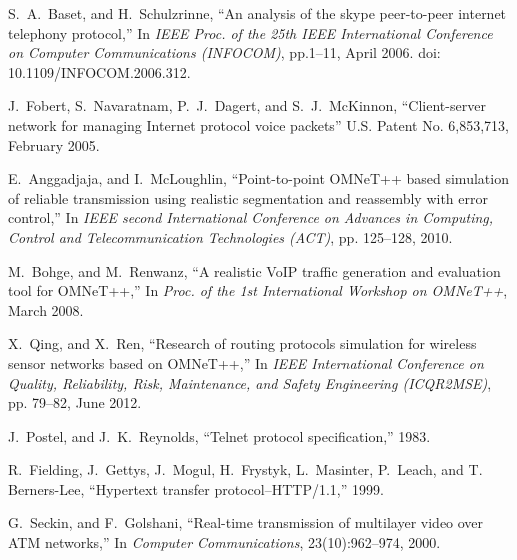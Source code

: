 \documentclass[conference]{IEEEtran}
\begin{document}
\begin{thebibliography}{10}
S.~A.~Baset, and H.~Schulzrinne, 
\newblock ``An analysis of the skype peer-to-peer internet telephony protocol,''
\newblock In {\em IEEE Proc. of the 25th IEEE International Conference 
on Computer Communications (INFOCOM)}, pp.1--11, April 2006. 
doi: 10.1109/INFOCOM.2006.312.


J.~Fobert, S.~Navaratnam, P.~J.~Dagert, and S.~J.~McKinnon, 
\newblock ``Client-server network for managing Internet protocol 
voice packets''
\newblock U.S. Patent No. 6,853,713, February 2005.


E.~Anggadjaja, and I.~McLoughlin, 
\newblock ``Point-to-point OMNeT++ based simulation of reliable transmission 
using realistic segmentation and reassembly with error control,''
\newblock In {\em IEEE second International Conference on Advances in 
Computing, Control and Telecommunication Technologies (ACT)}, pp. 125--128, 
2010.

M.~Bohge, and M.~Renwanz, 
\newblock ``A realistic VoIP traffic generation and evaluation tool for 
OMNeT++,'' 
\newblock In {\em Proc. of the 1st International Workshop on OMNeT++}, 
March 2008.

X.~Qing, and X.~Ren,
\newblock ``Research of routing protocols simulation for wireless sensor 
networks based on OMNeT++,''
\newblock In {\em IEEE International Conference on Quality, Reliability, Risk, 
Maintenance, and Safety Engineering (ICQR2MSE)}, pp. 79--82, June 2012. 

J.~Postel, and J.~K.~Reynolds, 
\newblock ``Telnet protocol specification,'' 1983.

R.~Fielding, J.~Gettys, J.~Mogul, H.~Frystyk, L.~Masinter, P.~Leach, and T.~
Berners-Lee, 
\newblock ``Hypertext transfer protocol–HTTP/1.1,'' 1999.

G.~Seckin, and F.~Golshani, 
\newblock ``Real-time transmission of multilayer video over ATM networks,''
\newblock In {\em Computer Communications}, 23(10):962--974, 2000.


\end{thebibliography}

%
\end{document}
